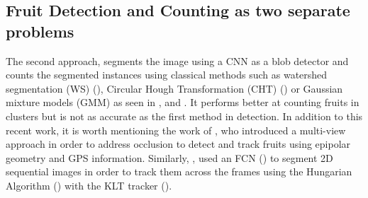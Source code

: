 \subsection{Fruit Detection and Counting as two separate problems}
The second approach, segments the image using a CNN as a blob detector and counts the segmented instances using classical methods such as watershed segmentation (WS) (\cite{beucher1992watershed}), Circular Hough Transformation (CHT) (\cite{atherton1999size}) or Gaussian mixture models (GMM) as seen in \cite{hani2018comparative}, \cite{bargoti2017image} and  \cite{chen2017counting}. It performs better at counting fruits in clusters but is not as accurate as the first method in detection. In addition to this recent work, it is worth mentioning the work of \cite{stein2016image}, who introduced a multi-view approach in order to address occlusion to detect and track fruits using epipolar geometry and GPS information. Similarly, \cite{liu2018robust}, used an FCN (\cite{long2015fully}) to segment 2D sequential images in order to track them across the frames using the Hungarian Algorithm (\cite{kuhn1955hungarian}) with the KLT tracker (\cite{lucas1981iterative}).

